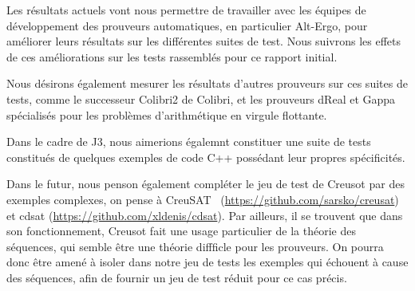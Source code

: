\documentclass[a4paper,11pt]{article}
\begin{document}
Les résultats actuels vont nous permettre de travailler avec les équipes de
développement des prouveurs automatiques, en particulier Alt-Ergo, pour
améliorer leurs résultats sur les différentes suites de test. Nous suivrons les
effets de ces améliorations sur les tests rassemblés pour ce rapport initial.

Nous désirons également mesurer les résultats d'autres prouveurs sur ces suites
de tests, comme le successeur Colibri2 de Colibri, et les prouveurs dReal et
Gappa spécialisés pour les problèmes d'arithmétique en virgule flottante.

Dans le cadre de J3, nous aimerions égalemnt constituer une suite de tests
constitués de quelques exemples de code C++ possédant leur propres spécificités.

Dans le futur, nous penson également compléter le jeu de test de
Creusot par des exemples complexes, on pense à CreuSAT~\cite{skotam22creusat}
(\url{https://github.com/sarsko/creusat}) et cdsat
(\url{https://github.com/xldenis/cdsat}). Par ailleurs, il se trouvent
que dans son fonctionnement, Creusot fait une usage particulier de la
théorie des séquences, qui semble être une théorie diffficle pour les
prouveurs. On pourra donc être amené à isoler dans notre jeu de tests
les exemples qui échouent à cause des séquences, afin de fournir un
jeu de test réduit pour ce cas précis.

\clearpage



%
\end{document}

